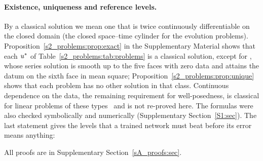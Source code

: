 \paragraph{Existence, uniqueness and reference levels.}
By a classical solution we mean one that is twice continuously differentiable on the closed
domain (the closed space--time cylinder for the evolution problems).
Proposition~\ref{s2_problems:prop:exact} in the Supplementary Material shows that each $u^{*}$
of Table~\ref{s2_problems:tab:problems} is a classical solution, except for \PLthree, whose
series solution is smooth up to the five faces with zero data and attains the datum on the
sixth face in mean square; Proposition~\ref{s2_problems:prop:unique} shows that each problem
has no other solution in that class. Continuous dependence on the data, the remaining
requirement for well-posedness, is classical for linear problems of these
types~\citep{evans2010} and is not re-proved here. The formulas were also checked
symbolically and numerically (Supplementary Section~\ref{S1:sec}). The last statement gives
the levels that a trained network must beat before its error means anything:

\begin{proposition}\label{s2_problems:prop:floors}
\StmtFloors
\end{proposition}

\noindent All proofs are in Supplementary Section~\ref{sA_proofs:sec}.
